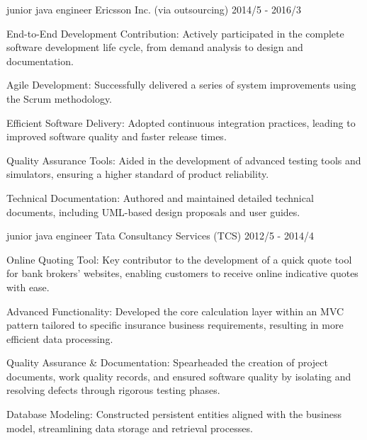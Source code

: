 \begin{cventries}
\cventry
  {junior java engineer } %
  {Ericsson Inc. \tiny{(via outsourcing)}} %
  {} %
  {2014/5 - 2016/3} %
  {
    \begin{cvitems} %
      \item {End-to-End Development Contribution: Actively participated in the complete software development life cycle, from demand analysis to design and documentation. }
      \item {Agile Development: Successfully delivered a series of system improvements using the Scrum methodology. }
      \item {Efficient Software Delivery: Adopted continuous integration practices, leading to improved software quality and faster release times.    }
      \item {Quality Assurance Tools: Aided in the development of advanced testing tools and simulators, ensuring a higher standard of product reliability.  }
      \item {Technical Documentation: Authored and maintained detailed technical documents, including UML-based design proposals and user guides.     }
    \end{cvitems}
  }

\cventry
  {junior java engineer } %
  {Tata Consultancy Services (TCS)} %
  {} %
  {2012/5 - 2014/4} %
  {
    \begin{cvitems} %
      \item {Online Quoting Tool: Key contributor to the development of a quick quote tool for bank brokers' websites, enabling customers to receive online indicative quotes with ease. }
      \item {Advanced Functionality: Developed the core calculation layer within an MVC pattern tailored to specific insurance business requirements, resulting in more efficient data processing.}
      \item {Quality Assurance \& Documentation: Spearheaded the creation of project documents, work quality records, and ensured software quality by isolating and resolving defects through rigorous testing phases.  }
      \item {Database Modeling: Constructed persistent entities aligned with the business model, streamlining data storage and retrieval processes. }
    \end{cvitems}
  }

\end{cventries}
